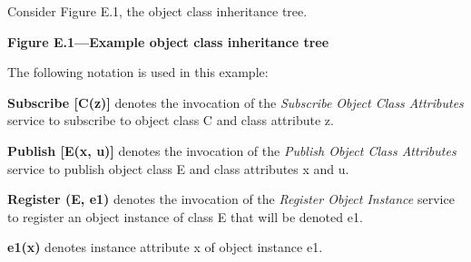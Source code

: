 \begin{annexstdpage}
    Consider Figure E.1, the object class inheritance tree.

    \begin{center}

        \vspace{2pt}
        {\sffamily\bfseries\fontsize{9.0}{10.4}\selectfont Figure E.1---Example object class inheritance tree}
    \end{center}

    The following notation is used in this example:

    \begin{stddashlist}
        \item \textbf{Subscribe [C(z)]} denotes the invocation of the \textit{Subscribe Object Class Attributes} service to subscribe to object class C and class attribute z.
        \item \textbf{Publish [E(x, u)]} denotes the invocation of the \textit{Publish Object Class Attributes} service to publish object class E and class attributes x and u.
        \item \textbf{Register (E, e1)} denotes the invocation of the \textit{Register Object Instance} service to register an object instance of class E that will be denoted e1.
        \item \textbf{e1(x)} denotes instance attribute x of object instance e1.
    \end{stddashlist}


\end{annexstdpage}
